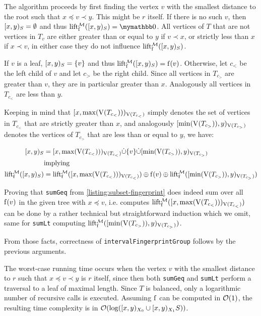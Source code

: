 The algorithm proceeds by first finding the vertex $v$ with the smallest distance to the root such that $x \preceq v \prec y$. This might be $r$ itself. If there is no such $v$, then $[{x},{y})_{S} = \emptyset$ and thus $\lift{\f}{\mathcal{M}}(\interval{x}{y}{S}) = \neutraladd$. All vertices of $T$ that are not vertices in $T_v$ are either greater than or equal to $y$ if $v \prec x$, or strictly less than $x$ if $x \prec v$, in either case they do not influence $\operatorname{lift_{\operatorname{f}}^{\mathcal{M}}}([{x},{y})_{S})$.

If $v$ is a leaf, $[{x},{y})_{S} = \{v\}$ and thus $\operatorname{lift_{\operatorname{f}}^{\mathcal{M}}}([{x},{y})_{S}) = \operatorname{f}(v)$. Otherwise, let $c_{<}$ be the left child of $v$ and let $c_{>}$ be the right child. Since all vertices in $T_{c_{>}}$ are greater than $v$, they are in particular greater than $x$. Analogously all vertices in $T_{c_{<}}$ are less than $y$.

Keeping in mind that $[{x},{\max(\operatorname{V}(T_{c_{<}}))})_{\operatorname{V}(T_{c_{<}})}$ simply denotes the set of vertices in $T_{c_{<}}$ that are strictly greater than $x$, and analogously $[{\min(\operatorname{V}(T_{c_{>}}))},{y})_{\operatorname{V}(T_{c_{>}})}$ denotes the vertices of $T_{c_{>}}$ that are less than or equal to $y$, we have:

\begin{align*}
[{x},{y})_{S} &= {[{x},{\max(\operatorname{V}(T_{c_{<}}))})_{\operatorname{V}(T_{c_{<}})}} \dot{\cup} {{\{v\}} \dot{\cup} {[{\min(\operatorname{V}(T_{c_{>}}))},{y})_{\operatorname{V}(T_{c_{>}})}}}\\
&\mathrm{implying}\\
\operatorname{lift_{\operatorname{f}}^{\mathcal{M}}}([{x},{y})_{S}) &= {\operatorname{lift_{\operatorname{f}}^{\mathcal{M}}}([{x},{\max(\operatorname{V}(T_{c_{<}}))})_{\operatorname{V}(T_{c_{<}})})} \oplus {{\operatorname{f}(v)} \oplus{\operatorname{lift_{\operatorname{f}}^{\mathcal{M}}}([{\min(\operatorname{V}(T_{c_{>}}))},{y})_{\operatorname{V}(T_{c_{>}})})}}\\
\end{align*}

Proving that \texttt{sumGeq} from \cref{listing:subset-fingerprint} does indeed sum over all $\operatorname{f}(v)$ in the given tree with $x \preceq v$, i.e. computes $\operatorname{lift_{\operatorname{f}}^{\mathcal{M}}}([{x},{\max(\operatorname{V}(T_{c_{<}}))})_{\operatorname{V}(T_{c_{<}})})$ can be done by a rather technical but straightforward induction which we omit, same for \texttt{sumLt} computing $\operatorname{lift_{\operatorname{f}}^{\mathcal{M}}}([{\min(\operatorname{V}(T_{c_{>}}))},{y})_{\operatorname{V}(T_{c_{>}})})$.

From those facts, correctness of \texttt{intervalFingerprintGroup} follows by the previous arguments.

The worst-case running time occurs when the vertex $v$ with the smallest distance to $r$ such that $x \preceq v \prec y$ is $r$ itself, since then both \texttt{sumGeq} and \texttt{sumLt} perform a traversal to a leaf of maximal length. Since $T$ is balanced, only a logarithmic number of recursive calls is executed. Assuming $\operatorname{f}$ can be computed in $\mathcal{O}(1)$, the resulting time complexity is in $\mathcal{O}(\log([{x},{y})_{X_0} \cup [{x},{y})_{X_1}{S}))$.

